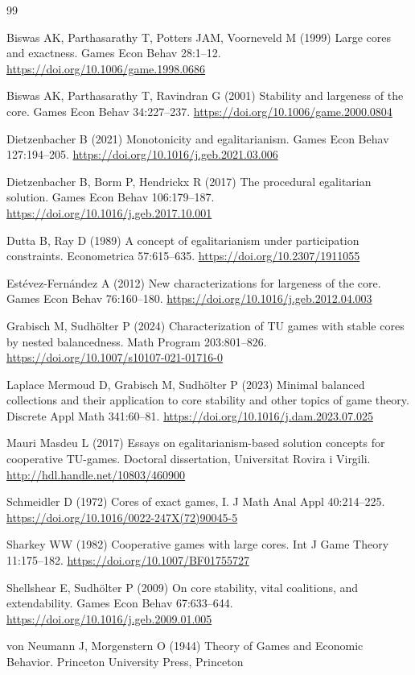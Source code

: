 \documentclass[11pt]{article}
\begin{document}
\begin{thebibliography}{99}

Biswas AK, Parthasarathy T, Potters JAM, Voorneveld M (1999) Large cores
and exactness. Games Econ Behav 28:1--12.
\url{https://doi.org/10.1006/game.1998.0686}

Biswas AK, Parthasarathy T, Ravindran G (2001) Stability and largeness of
the core. Games Econ Behav 34:227--237.
\url{https://doi.org/10.1006/game.2000.0804}

Dietzenbacher B (2021) Monotonicity and egalitarianism.
Games Econ Behav 127:194--205.
\url{https://doi.org/10.1016/j.geb.2021.03.006}

Dietzenbacher B, Borm P, Hendrickx R (2017) The procedural egalitarian
solution. Games Econ Behav 106:179--187.
\url{https://doi.org/10.1016/j.geb.2017.10.001}

Dutta B, Ray D (1989) A concept of egalitarianism under participation
constraints. Econometrica 57:615--635.
\url{https://doi.org/10.2307/1911055}

Est\'evez-Fern\'andez A (2012) New characterizations for largeness of the
core. Games Econ Behav 76:160--180.
\url{https://doi.org/10.1016/j.geb.2012.04.003}

Grabisch M, Sudh\"olter P (2024) Characterization of TU games with stable
cores by nested balancedness. Math Program 203:801--826.
\url{https://doi.org/10.1007/s10107-021-01716-0}

Laplace Mermoud D, Grabisch M, Sudh\"olter P (2023) Minimal balanced
collections and their application to core stability and other topics of game
theory. Discrete Appl Math 341:60--81.
\url{https://doi.org/10.1016/j.dam.2023.07.025}

Mauri Masdeu L (2017) Essays on egalitarianism-based solution concepts for
cooperative TU-games. Doctoral dissertation, Universitat Rovira i Virgili.
\url{http://hdl.handle.net/10803/460900}

Schmeidler D (1972) Cores of exact games, I.
J Math Anal Appl 40:214--225.
\url{https://doi.org/10.1016/0022-247X(72)90045-5}

Sharkey WW (1982) Cooperative games with large cores.
Int J Game Theory 11:175--182.
\url{https://doi.org/10.1007/BF01755727}

Shellshear E, Sudh\"olter P (2009) On core stability, vital coalitions, and
extendability. Games Econ Behav 67:633--644.
\url{https://doi.org/10.1016/j.geb.2009.01.005}

von Neumann J, Morgenstern O (1944) Theory of Games and Economic Behavior.
Princeton University Press, Princeton

\end{thebibliography}
\end{document}

